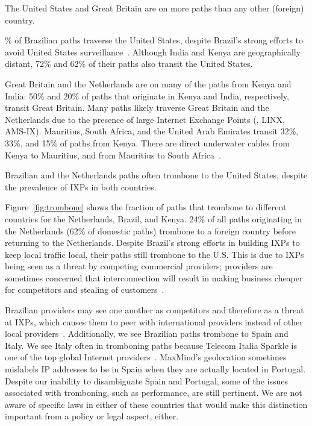 \begin{finding}
The United States and Great Britain are on more paths than any other (foreign) country.
\end{finding}
\% of Brazilian paths traverse the United States, despite Brazil's
strong efforts to avoid United States surveillance~\cite{brazil_break_from_US,brazil_us_companies,brazil_conference,brazil_conference2,brazil_human_rights,brazil_cable}.  Although India and
Kenya are geographically distant, 72\% and 62\% of their paths also transit
the United States.

Great Britain and the Netherlands are on 
many of the paths from Kenya and India:
50\% and 20\% of
paths that originate in Kenya and India, respectively, transit Great
Britain.   Many paths likely traverse Great Britain and the Netherlands due to
the presence of large Internet Exchange Points (\ie, LINX, AMS-IX).
Mauritius, South Africa, and the United Arab Emirates transit 32\%,
33\%, and 15\% of paths from Kenya.  There are direct underwater cables
from Kenya to Mauritius, and from Mauritius to South
Africa~\cite{cablemap}.



\begin{finding}
Brazilian and the Netherlands paths often trombone to the United States, despite the prevalence of IXPs in both countries.
\end{finding}
\noindent
Figure~\ref{fig:trombone}
shows the fraction of paths that trombone to
different countries for the Netherlands, Brazil, and Kenya. 24\% of
all paths originating in the Netherlands (62\% of domestic paths)
trombone to a foreign country before returning to the
Netherlands. Despite Brazil's strong efforts in building IXPs to keep
local traffic local, 
their paths still trombone to the U.S.  This is due to IXPs being seen
as a threat by competing commercial providers; providers are sometimes
concerned that interconnection will result in making business
cheaper for competitors and stealing of customers~\cite{ixp_policy}.

Brazilian providers may see one another as competitors and therefore as a
threat at IXPs, which causes them to peer with international providers instead
of other local providers~\cite{ixp_policy}.  Additionally, we see Brazilian paths trombone to
Spain and Italy.  We see Italy often in tromboning paths because Telecom
Italia Sparkle is one of the top global Internet providers~\cite{bakers}. 
MaxMind's geolocation sometimes mislabels IP addresses to be in
Spain when they are actually located in Portugal.  Despite our inability to
disambiguate Spain and Portugal, some of the issues associated with tromboning,
such as performance, are still pertinent. We are not aware of specific laws in
either of these countries that would make this distinction important from a
policy or legal aspect, either.

